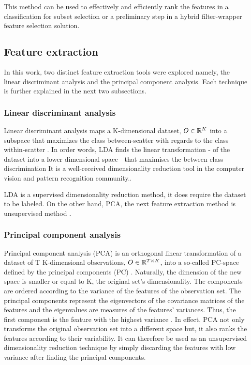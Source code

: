 This method can be used to effectively and efficiently rank the features in a classification for subset selection or a preliminary step in a hybrid filter-wrapper feature selection solution.  

\subsection{Feature extraction}
In this work, two distinct feature extraction tools were explored namely, the linear discriminant analysis and the principal component analysis.
Each technique is further explained in the next two subsections.
 
\subsubsection{Linear discriminant analysis}
Linear discriminant analysis maps a K-dimensional dataset, \(O \in \Bbb R^{K}\) into a subspace that maximizes the class between-scatter with regards to the class within-scatter \cite{prtool}.
In order words, LDA finds the linear transformation - of the dataset into a lower dimensional space - that maximises the between class discrimination \cite{lda2015}
It is a well-received dimensionality reduction tool in the computer vision and pattern recognition community.\cite{lda2015}.

 LDA is a supervised dimensionality reduction method, it does require the dataset to be labeled. On the other hand, PCA, the next feature extraction method is unsupervised method \cite{prtool}.
 
\subsubsection{Principal component analysis}
 Principal component analysis (PCA) is an orthogonal linear transformation of a dataset of T K-dimensional observations, \(O \in \Bbb R^{T\times K}\), into a so-called PC-space defined by the principal components (PC) \cite{dime2017}.
 Naturally, the dimension of the new space is smaller or equal to K, the original set's dimensionality. The components are ordered according to the variance of the features of the observation set. The principal components represent the eigenvectors of the covariance matrices of the features and the eigenvalues are measures of the features' variances. Thus, the first component is the feature with the highest variance \cite{dime2017}.
 In effect, PCA not only transforms the original observation set into a different space but, it also ranks the features according to their variability. It can therefore be used as an unsupervised dimensionality reduction technique by simply discarding the features with low variance after finding the principal components.